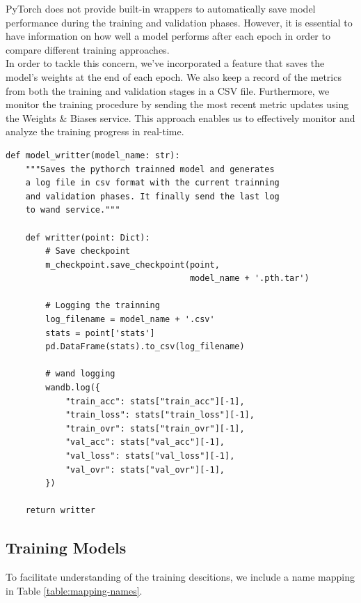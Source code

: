 PyTorch does not provide built-in wrappers to automatically save model
performance during the training and validation phases. However, it is essential
to have information on how well a model performs after each epoch in order to
compare different training approaches. \\

In order to tackle this concern, we've incorporated a feature that saves the
model's weights at the end of each epoch. We also keep a record of the metrics
from both the training and validation stages in a CSV file. Furthermore, we
monitor the training procedure by sending the most recent metric updates using
the Weights \& Biases service. This approach enables us to effectively monitor
and analyze the training progress in real-time.

\begin{Verbatim}[fontsize=\scriptsize]
def model_writter(model_name: str):
    """Saves the pythorch trainned model and generates
    a log file in csv format with the current trainning
    and validation phases. It finally send the last log
    to wand service."""

    def writter(point: Dict):
        # Save checkpoint
        m_checkpoint.save_checkpoint(point,
                                     model_name + '.pth.tar')

        # Logging the trainning
        log_filename = model_name + '.csv'
        stats = point['stats']
        pd.DataFrame(stats).to_csv(log_filename)

        # wand logging
        wandb.log({
            "train_acc": stats["train_acc"][-1],
            "train_loss": stats["train_loss"][-1],
            "train_ovr": stats["train_ovr"][-1],
            "val_acc": stats["val_acc"][-1],
            "val_loss": stats["val_loss"][-1],
            "val_ovr": stats["val_ovr"][-1],
        })

    return writter
\end{Verbatim}

\newpage


\subsection{Training Models}

To facilitate understanding of the training descitions, we include a name
mapping in Table \ref{table:mapping-names}.

